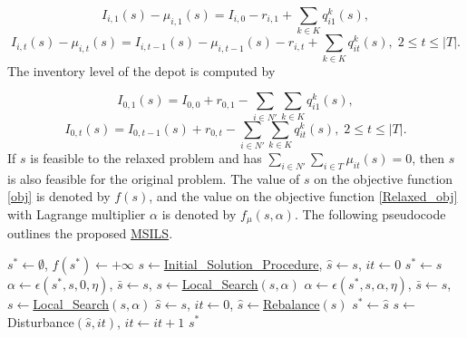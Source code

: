 \documentclass{article}
\begin{document}
\begin{equation}\label{initial I0}
I_{i,1}(s) - \mu_{i,1}(s)= I_{i,0} - r_{i,1} + \sum_{k\in K}q^k_{i1}(s),
\end{equation}
\begin{equation}\label{Initial I1}
I_{i,t}(s)-\mu_{i,t}(s)= I_{i,t-1}(s) -\mu_{i,t-1}(s) - r_{i,t} + \sum_{k\in K}q^k_{it}(s),\; 2\leq t\leq |T|.
\end{equation}
The inventory level of the depot is computed by 

\begin{equation}\label{initial I0}
I_{0,1}(s) = I_{0,0} + r_{0,1} - \sum_{i\in N'}\sum_{k\in K}q^k_{i1}(s),
\end{equation}
\begin{equation}\label{Initial I1}
I_{0,t}(s)= I_{0,t-1}(s) + r_{0,t} - \sum_{i\in N'}\sum_{k\in K}q^k_{it}(s),\; 2\leq t\leq |T|.
\end{equation}
If $s$ is feasible to the relaxed problem and has $\sum_{i\in N'} \sum_{i\in T} \mu_{it}(s) = 0$, then $s$ is also feasible for the original problem. The value of $s$ on the objective function \eqref{obj} is denoted by $f(s)$, and the value on the objective function \eqref{Relaxed_obj} with Lagrange multiplier $\alpha$ is denoted by $f_{\mu}(s, \alpha)$. The following pseudocode outlines the proposed \hyperref[alg:MSILS]{MSILS}. 


\begin{algorithm}[H]
\caption{\textbf{MSILS}}\label{alg:MSILS}
\begin{algorithmic}[1]
\STATE $s^*\gets\emptyset$, $f(s^*)\gets+\infty$ \label{initialisation}
 \label{start msils}
\STATE $s\gets$\hyperref[alg:InitialSchedule]{Initial\_Solution\_Procedure}, $\hat{s}\gets s$, $it\gets0$ \label{initial solution construction}
 \STATE $s^*\gets s$ \ENDIF
{} \label{start ils}
\STATE $\alpha\gets\epsilon(s^*,s,0,\eta)$, $\bar{s}\gets s$, $s\gets$\hyperref[alg:LocalSearch]{Local\_Search}$(s,\alpha)$ \label{LS:initialise alpha}
 \label{search: repeat}
    \STATE $\alpha\gets\epsilon(s^*,s,\alpha,\eta)$, $\bar{s}\gets s$, $s\gets$\hyperref[alg:LocalSearch]{Local\_Search}$(s,\alpha)$ \label{LS:update alpha}
\ENDWHILE \label{search: until}
    \STATE $\hat{s}\gets s$, $it\gets0$, $\hat{s}\gets$\hyperref[alg:rebalance]{Rebalance}$(\hat{s})$ \label{run rebalance}
\ENDIF
{} \STATE $s^*\gets\hat{s}$ \ENDIF
\STATE $s\gets$ Disturbance$(\hat{s},it)$, $it\gets it+1$ \label{disturb}
\ENDWHILE \label{end ils}
\ENDFOR \label{end msils}
\RETURN $s^*$
\end{algorithmic}
\end{algorithm}
\end{document}
